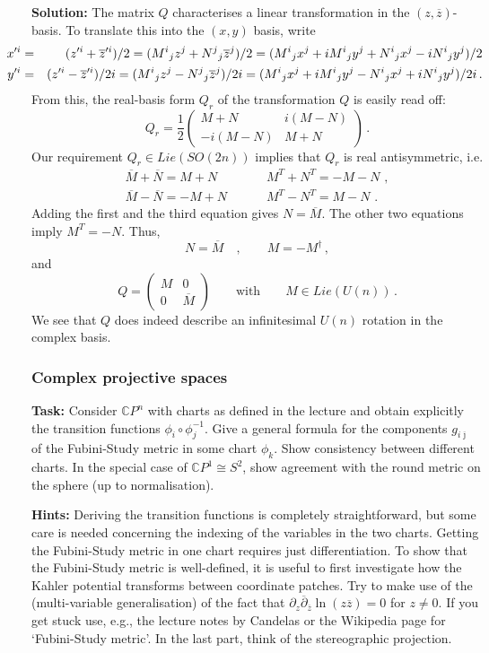 \documentclass[12pt]{article}
\newcommand{\be}{\begin{equation}}
\newcommand{\ee}{\end{equation}}
\newcommand{\bea}{\begin{eqnarray}}
\newcommand{\eea}{\end{eqnarray}}
\newcommand{\ol}{\overline}
\numberwithin{equation}{section}
\begin{document}
\noindent
{\bf Solution:} The matrix $Q$ characterises a linear transformation in the $(z,\ol{z})$-basis. To translate this into the $(x,y)$ basis, write
\bea
\hspace*{-.7cm}x'^i &=& (z'^i+\ol{z}'^i)/2 = ( M^i{}_jz^j+N^j{}_j\ol{z}^j)/2
= (M^i{}_jx^j + iM^i{}_jy^j + N^i{}_jx^j - iN^i{}_jy^j)/2
\\
\hspace*{-.7cm}y'^i &=& (z'^i-\ol{z}'^i)/2i = ( M^i{}_jz^j-N^j{}_j\ol{z}^j)/2i
= (M^i{}_jx^j + iM^i{}_jy^j - N^i{}_jx^j + iN^i{}_jy^j)/2i\,.
\eea
From this, the real-basis form $Q_r$ of the transformation $Q$ is easily read off:
\be
Q_r=\frac{1}{2}\left(\begin{array}{cc} M+N & i(M-N) \\ -i(M-N) & M+N
\end{array}\right)\,.
\ee
Our requirement $Q_r\in Lie(SO(2n))$ implies that $Q_r$ is real antisymmetric, i.e.
\bea
\ol{M}+\ol{N}=M+N\,\,\quad&\quad M^T+N^T=-M-N\,\,,
\\
\ol{M}-\ol{N}=-M+N\,\,\quad&\quad M^T-N^T = M-N\,\,.
\eea
Adding the first and the third equation gives $N=\ol{M}$. The other two equations imply $M^T=-N$. Thus, 
\be
N=\ol{M}\quad,\qquad M=-M^\dagger\,,
\ee
and
\be
Q=\left(\begin{array}{cc} M & 0 \\ 0 & \ol{M}
\end{array}\right)\qquad\mbox{with}\qquad M\in Lie(U(n))\,.
\ee
We see that $Q$ does indeed describe an infinitesimal $U(n)$ rotation in the complex basis.







\subsubsection{Complex projective spaces}
{\bf Task:} Consider $\mathbb{C}P^n$ with charts as defined in the lecture and obtain explicitly the transition functions $\phi_i\circ\phi_j^{-1}$. Give a general formula for the components $g_{i\ol{\jmath}}$ of the Fubini-Study metric in some chart $\phi_k$. Show consistency between different charts. In the special case of $\mathbb{C}P^1\cong S^2$, show agreement with the round metric on the sphere (up to normalisation).

\noindent
{\bf Hints:} Deriving the transition functions is completely straightforward, but some care is needed concerning the indexing of the variables in the two charts. Getting the Fubini-Study metric in one chart requires just differentiation. To show that the Fubini-Study metric is well-defined, it is useful to first investigate how the Kahler potential transforms between coordinate patches. Try to make use of the (multi-variable generalisation) of the fact that $\partial_z\ol{\partial}_{\ol{z}}\ln(z\ol{z})=0$ for $z\neq 0$. If you get stuck use, e.g., the lecture notes by Candelas \cite{Candelas:1987is} or the Wikipedia page for `Fubini-Study metric'. In the last part, think of the stereographic projection.
\end{document}
